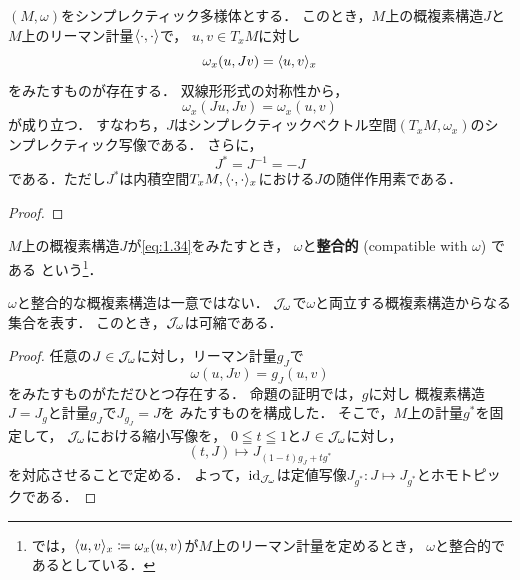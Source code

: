 \begin{PRP}
    \((M,\omega)\)をシンプレクティック多様体とする．
    このとき，\(M\)上の概複素構造\(J\)と
    \(M\)上のリーマン計量\(\inner<\cdot,\cdot>\)で，
    \(u,v\in T_{x}M\)に対し\begin{equation}
        \omega_{x}(u,Jv)=\inner<u,v>_{x}\label{eq:1.34}
    \end{equation}
    をみたすものが存在する．
    双線形形式の対称性から，
    \begin{equation}
        \omega_{x}(Ju,Jv)=\omega_{x}(u,v)\label{eq:1.35}
    \end{equation}
    が成り立つ．
    すなわち，\(J\)はシンプレクティックベクトル空間\(
        (T_{x}M,\omega_x)
    \)のシンプレクティック写像である．
    さらに，
    \begin{equation}
        J^{\ast}=J^{-1}=-J\label{eq:1.36}
    \end{equation}
    である．ただし\(J^{\ast}\)は内積空間\(
        T_{x}M,\inner<\cdot,\cdot>_{x}
    \)における\(J\)の随伴作用素である．
\end{PRP}

\begin{proof}
    
\end{proof}

\(M\)上の概複素構造\(J\)が\eqref{eq:1.34}をみたすとき，
\(\omega\)と\textbf{整合的} (compatible with \(\omega\)) である
という\footnote{
    \cite[4.1]{MS17}では，\(
        \inner<u,v>_{x}\coloneqq \omega_{x}(u,v)
    \)が\(M\)上のリーマン計量を定めるとき，
    \(\omega\)と整合的であるとしている．
}．

\(\omega\)と整合的な概複素構造は一意ではない．
\(\acstr[M]{\omega}\)で\(\omega\)と両立する概複素構造からなる集合を表す．
このとき，\(\acstr[M]{\omega}\)は可縮である．

\begin{proof}
    任意の\(J\in\acstr[M]{\omega}\)に対し，リーマン計量\(g_J\)で
    \[
        \omega(u,Jv)=g_J(u,v)
    \]をみたすものがただひとつ存在する．
    命題の証明では，\(g\)に対し
    概複素構造\(J=J_{g}\)と計量\(g_J\)で\(J_{g_J}=J\)を
    みたすものを構成した．
    そこで，\(M\)上の計量\(g^{\ast}\)を固定して，
    \(\acstr[M]{\omega}\)における縮小写像を，
    \(0\leqq t\leqq 1\)と\(J\in\acstr[M]{\omega}\)に対し，
    \[
        (t,J)\mapsto J_{(1-t)g_{J}+tg^{\ast}}
    \]
    を対応させることで定める．
    よって，\(\id_{\acstr[M]{\omega}}\)は定値写像\(
        J_{g^{\ast}}\colon J\mapsto J_{g^{\ast}}
    \)とホモトピックである．
\end{proof}

